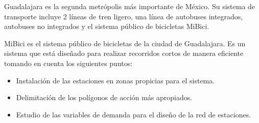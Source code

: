 Guadalajara es la segunda metrópolis más importante de México. Su sistema de transporte incluye 2 líneas de tren ligero, una línea de autobuses integrados, autobuses no integrados y el sistema público de bicicletas MiBici.

MiBici es el sistema público de bicicletas de la ciudad de Guadalajara. Es un sistema que está diseñado para realizar recorridos cortos de manera eficiente tomando en cuenta los siguientes puntos:

\begin{itemize}
  \item Instalación de las estaciones en zonas propicias para el sistema.
  \item Delimitación de los polígonos de acción más apropiados.
  \item Estudio de las variables de demanda para el diseño de la red de estaciones.
\end{itemize}